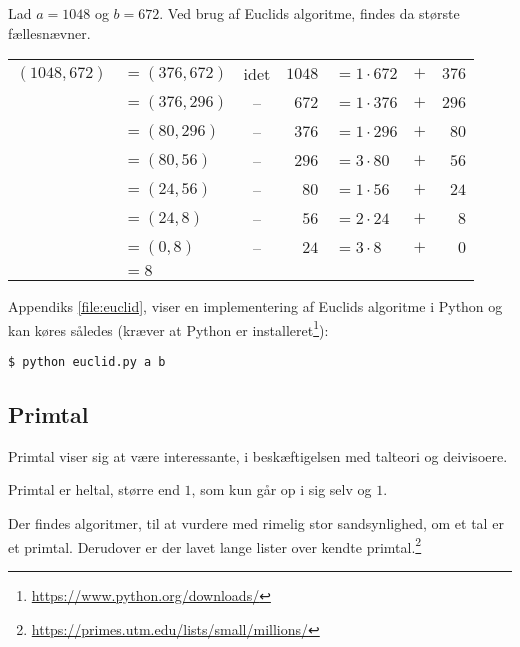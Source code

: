 \begin{eks}
    Lad \(a = 1048\) og \(b = 672\).
    Ved brug af Euclids algoritme, findes da største fællesnævner.
    \begin{center}
        \setlength{\tabcolsep}{5pt} %
        \begin{tabular}{r l c r l c r}
            \((1048, 672)\) & \(= (376, 672)\) & idet & \(1048\) & \(= 1 \cdot 672\) & \(+\) & \(376\)\\
                            & \(= (376, 296)\) & --   & \(672\) & \(= 1 \cdot 376\)  & \(+\) & \(296\)\\
                            & \(= (80, 296)\)  & --   & \(376\) & \(= 1 \cdot 296\)  & \(+\) & \(80\)\\
                            & \(= (80, 56)\)   & --   & \(296\) & \(= 3 \cdot 80\)   & \(+\) & \(56\)\\
                            & \(= (24, 56)\)   & --   & \(80\)  & \(= 1 \cdot 56\)   & \(+\) & \(24\)\\
                            & \(= (24, 8)\)    & --   & \(56\)  & \(= 2 \cdot 24\)   & \(+\) & \(8\)\\
                            & \(= (0, 8)\)     & --   & \(24\)  & \(= 3 \cdot 8\)    & \(+\) & \(0\)\\
                            & \(= 8\) & & & & &
        \end{tabular}
    \end{center}
\end{eks}
Appendiks \ref{file:euclid}, viser en implementering af Euclids algoritme i Python og kan køres således
(kræver at Python er installeret\footnote{\url{https://www.python.org/downloads/}}):
\begin{verbatim}
$ python euclid.py a b
\end{verbatim}


\subsection{Primtal}
Primtal viser sig at være interessante, i beskæftigelsen med talteori og deivisoere.

\begin{definition}[Primtal]
    Primtal er heltal, større end \(1\), som kun går op i sig selv og \(1\).
\end{definition}

Der findes algoritmer, til at vurdere med rimelig stor sandsynlighed, om et tal er et primtal.
Derudover er der lavet lange lister over kendte primtal.\footnote{\url{https://primes.utm.edu/lists/small/millions/}}


